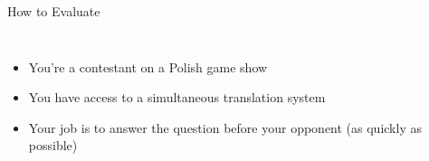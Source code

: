 \documentclass[compress]{beamer}
\newcommand{\fsi}[2]{
\begin{frame}[plain]
\vspace*{-1pt}
\makebox[\linewidth]{\texttt{[image: \#1]}}
\begin{center}
#2
\end{center}
\end{frame}
}
\begin{document}
\fsi{simtrans/liang_huang}{}
\fsi{simtrans/delay}{}

\begin{frame}{How to Evaluate}

  \begin{columns}
    \begin{itemize}
    \item You're a contestant on a Polish game show
    \item You have access to a simultaneous translation system
    \item Your job is to answer the question before your opponent (as
      quickly as possible)
    \end{itemize}
  \end{columns}

\end{frame}
\end{document}
